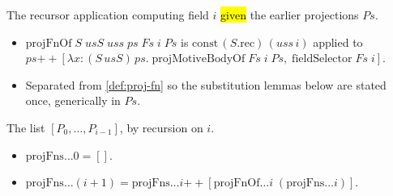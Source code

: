 \begin{definition}
  \label{def:proj-fn-of}
  \leanok

   The recursor application computing field $i$ \hl{given} the earlier
  projections $Ps$.
  \begin{itemize}
  \item $\mathrm{projFnOf}\;S\;usS\;uss\;ps\;Fs\;i\;Ps$ is $\mathrm{const}\,(S.\mathrm{rec})\,(uss\,i)$
        applied to $ps \mathbin{+\!\!+} [\lambda x{:}(S\,usS)\,ps.\;\mathrm{projMotiveBodyOf}\;Fs\;i\;Ps,\;
        \mathrm{fieldSelector}\;Fs\;i]$.
  \item Separated from \ref{def:proj-fn} so the substitution lemmas below are stated once,
        generically in $Ps$.
  \end{itemize}
\end{definition}

\begin{definition}
  \label{def:proj-fns}
  \leanok

   The list $[P_0,\dots,P_{i-1}]$, by recursion on $i$.
  \begin{itemize}
  \item $\mathrm{projFns}\dots 0 = []$.
  \item $\mathrm{projFns}\dots(i+1) = \mathrm{projFns}\dots i \mathbin{+\!\!+}
        [\mathrm{projFnOf}\dots i\;(\mathrm{projFns}\dots i)]$.
  \end{itemize}
\end{definition}

